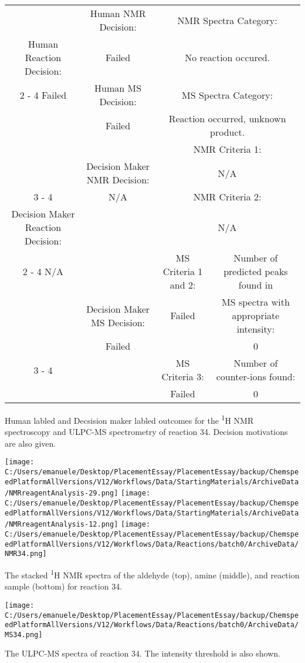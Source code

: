 \documentclass{article}%
\begin{document}
\begin{Decision Table}[H]%
\begin{tabular}{|c|c|c|c|}%
\hline%
&Human NMR Decision:&\multicolumn{2}{|c|}{NMR Spectra Category:}\\%
Human Reaction Decision:&Failed&\multicolumn{2}{|c|}{No reaction occured.}\\%
\cline{2%
-%
4}%
Failed&Human MS Decision:&\multicolumn{2}{|c|}{MS Spectra Category:}\\%
&Failed&\multicolumn{2}{|c|}{Reaction occurred, unknown product.}\\%
\hline%
&&\multicolumn{2}{|c|}{NMR Criteria 1:}\\%
&Decision Maker NMR Decision:&\multicolumn{2}{|c|}{N/A}\\%
\cline{3%
-%
4}%
&N/A&\multicolumn{2}{|c|}{NMR Criteria 2:}\\%
Decision Maker Reaction Decision:&&\multicolumn{2}{|c|}{N/A}\\%
\cline{2%
-%
4}%
N/A&&MS Criteria 1 and 2:&Number of predicted peaks found in\\%
&Decision Maker MS Decision:&Failed&MS spectra with appropriate intensity:\\%
&Failed&&0\\%
\cline{3%
-%
4}%
&&MS Criteria 3:&Number of counter{-}ions found:\\%
&&Failed&0\\%
\hline%
\end{tabular}%
\caption{Human labled and Decsision maker labled outcomes for the \textsuperscript{1}H NMR spectroscopy and ULPC-MS spectrometry of reaction 34. Decision motivations are also given.}%
\end{Decision Table}%
\begin{NMR Spectra}[H]%
\begin{center}%
\texttt{[image: C:/Users/emanuele/Desktop/PlacementEssay/PlacementEssay/backup/ChemspeedPlatformAllVersions/V12/Workflows/Data/StartingMaterials/ArchiveData/NMRreagentAnalysis-29.png]}\hfill%
\texttt{[image: C:/Users/emanuele/Desktop/PlacementEssay/PlacementEssay/backup/ChemspeedPlatformAllVersions/V12/Workflows/Data/StartingMaterials/ArchiveData/NMRreagentAnalysis-12.png]}\hfill%
\texttt{[image: C:/Users/emanuele/Desktop/PlacementEssay/PlacementEssay/backup/ChemspeedPlatformAllVersions/V12/Workflows/Data/Reactions/batch0/ArchiveData/NMR34.png]}\hfill%
\end{center}%
\caption{The stacked \textsuperscript{1}H NMR spectra of the aldehyde (top), amine (middle), and reaction sample (bottom) for reaction 34.}%
\end{NMR Spectra}%
\begin{MS Spectra}[H]%
\begin{center}%
\texttt{[image: C:/Users/emanuele/Desktop/PlacementEssay/PlacementEssay/backup/ChemspeedPlatformAllVersions/V12/Workflows/Data/Reactions/batch0/ArchiveData/MS34.png]}\hfill%
\end{center}%
\caption{The ULPC-MS spectra of reaction 34. The intensity threshold is also shown.}%
\end{MS Spectra}%
\end{document}
